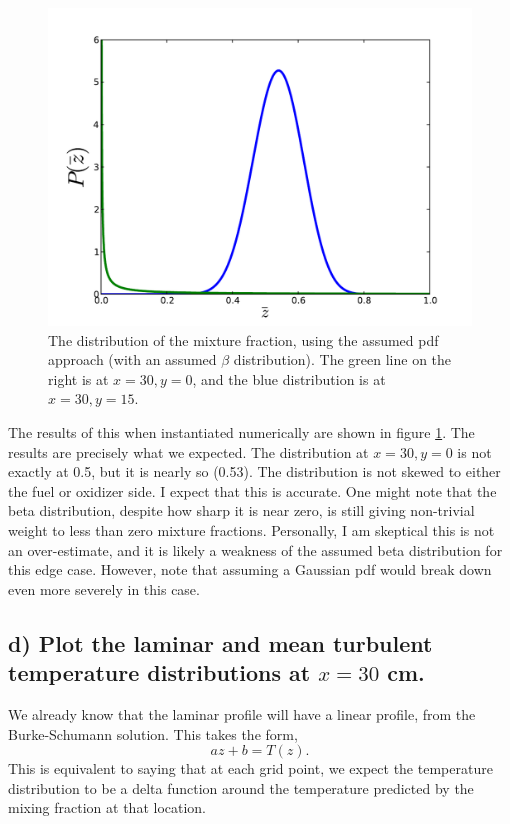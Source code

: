 \documentclass{article}
\begin{document}
  \begin{figure}[!htb]
   \begin{center}
    \includegraphics[width = 12 cm]{figs/pdf.pdf}
    \caption{The distribution of the mixture fraction, using the assumed
    pdf approach (with an assumed $\beta$ distribution). The green line
    on the right is at $x=30,y=0$, and the blue distribution is at $x=30,y=15$.}
    \label{pdf}
   \end{center}
  \end{figure}

The results of this when instantiated numerically are shown in figure
\ref{pdf}. The results are precisely what we expected. The distribution
at $x=30,y=0$ is not exactly at 0.5, but it is nearly so (0.53). The
distribution is not skewed to either the fuel or oxidizer side. 
I expect that this is accurate. 
One might note
that the beta distribution, despite how sharp it is near zero, is still
giving non-trivial weight to less than zero mixture
fractions. Personally, I am skeptical this is not an over-estimate, and
it is likely a weakness of the assumed beta distribution for this edge
case. However, note that assuming a Gaussian pdf would break down even
more severely in this case. 

%
%
%
%
\subsection*{d) Plot the laminar and mean turbulent temperature
distributions at $x=30$ cm.}

We already know that the laminar profile will have a linear profile,
from the Burke-Schumann solution. This takes the form, 
\begin{equation}
a z + b = T(z). 
\label{eq}
\end{equation}
This is equivalent to saying that at each grid point, we expect the
temperature distribution to be a delta function around the temperature
predicted by the mixing fraction at that location. 
\end{document}
